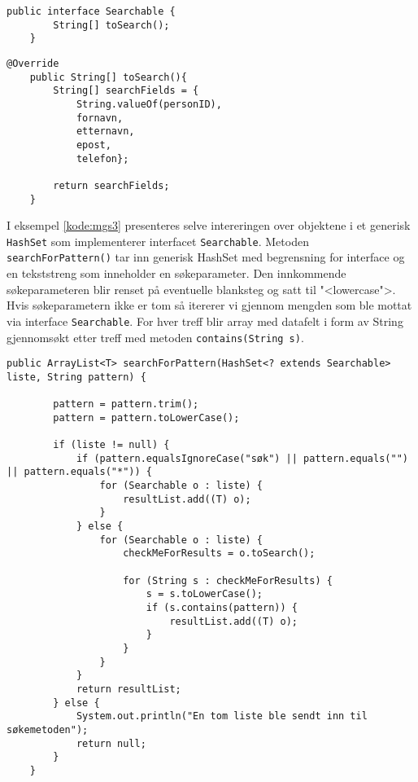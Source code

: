 \begin{lstlisting}[caption=Oversikt over \texttt{Searchable} interface, label=kode:mgs1]
	public interface Searchable {
   		String[] toSearch();
	}
\end{lstlisting}

\begin{lstlisting}[caption=Implemntasjon av metode \texttt{toSearch() i klassen Person.java}, label=kode:mgs2]
	@Override
    public String[] toSearch(){
        String[] searchFields = {
            String.valueOf(personID), 
            fornavn, 
            etternavn, 
            epost, 
            telefon};
        
        return searchFields;
    }
\end{lstlisting}

I eksempel \ref{kode:mgs3} presenteres selve intereringen over objektene i et generisk \texttt{HashSet} som implementerer interfacet \texttt{Searchable}. Metoden \texttt{searchForPattern()} tar inn generisk HashSet med begrensning for interface og en tekststreng som inneholder en søkeparameter. Den innkommende søkeparameteren blir renset på eventuelle blanksteg og satt til "<lowercase">. Hvis søkeparametern ikke er tom så itererer vi gjennom mengden som ble mottat via interface \texttt{Searchable}. For hver treff blir array med datafelt i form av String gjennomsøkt etter treff med metoden \texttt{contains(String s)}. 

\begin{lstlisting}[caption=Iterasjon over generisk \texttt{HashSet} som implementerer interface \texttt{Searchable}, label=kode:mgs3]
    public ArrayList<T> searchForPattern(HashSet<? extends Searchable> liste, String pattern) {

        pattern = pattern.trim();
        pattern = pattern.toLowerCase();

        if (liste != null) {
            if (pattern.equalsIgnoreCase("søk") || pattern.equals("") || pattern.equals("*")) {
                for (Searchable o : liste) {
                    resultList.add((T) o);
                }
            } else {
                for (Searchable o : liste) {
                    checkMeForResults = o.toSearch();

                    for (String s : checkMeForResults) {
                        s = s.toLowerCase();
                        if (s.contains(pattern)) {
                            resultList.add((T) o);
                        }
                    }
                }
            }
            return resultList;
        } else {
            System.out.println("En tom liste ble sendt inn til søkemetoden");
            return null;
        }
    }
\end{lstlisting}


